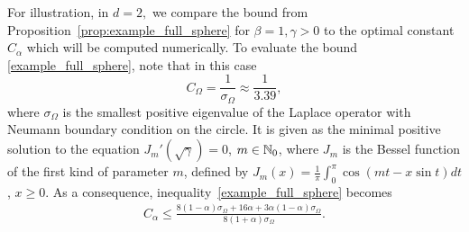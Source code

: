 \documentclass[a4paper]{article}
\theoremstyle{definition}
\numberwithin{equation}{section}
\begin{document}
For illustration, in $d=2, $ we compare the bound from Proposition~\ref{prop:example_full_sphere} for $\beta=1,\gamma>0$ to the  optimal constant $C_\alpha$  which will be computed numerically. To evaluate the bound \eqref{example_full_sphere}, note that  in this case   \begin{equation}
\label{def:gamma_star}
C_\Omega=\frac{1}{\sigma_{\Omega}}\approx\frac{1}{3.39}, 
\end{equation}
where $\sigma_{\Omega}$ is the smallest positive eigenvalue of the Laplace operator with Neumann boundary condition on the circle. It is given as the minimal positive solution to the equation $J_m'(\sqrt{\gamma})=0$, $m\in\mathbb{N}_0$, where $J_m$ is the Bessel function of the first kind of parameter $m$,  defined  by $J_m(x)=\frac{1}{\pi} \int_0^\pi\cos (mt-x \sin t) dt$, $x \geq 0$.  As a consequence, 
 inequality~\eqref{example_full_sphere} becomes  
\begin{align}
\label{example_full_sphere_dim2}
C_\alpha \leq
\frac{8 (1-\alpha)\sigma_{\Omega}+16\alpha+3\alpha(1-\alpha)\sigma_{\Omega}}
{8(1+\alpha)\sigma_{\Omega} }.
\end{align}
\end{document}
